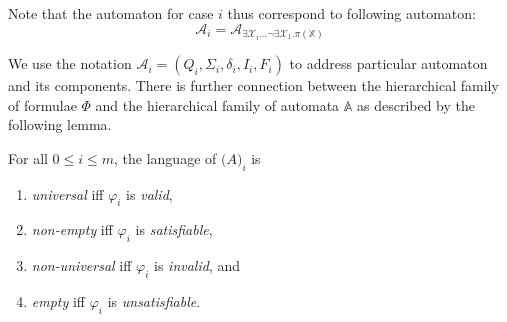  Note that the automaton for case $i$ thus correspond to following automaton:
 \begin{equation} \mathcal{A}_i =
 \mathcal{A}_{\exists\mathcal{X}_i\ldots\neg\exists\mathcal{X}_1.
 \pi(\mathbb{X})}\end{equation}
 
 We use the notation $\mathcal{A}_i = (Q_i, \Sigma_i, \delta_i, I_i, F_i)$ to
 address particular automaton and its components.
There is further connection between the hierarchical family of formulae $\Phi$
and the hierarchical family of automata $\mathbb{A}$ as described by the
following lemma.
 \begin{lemma} For all $0 \leq i \leq m$, the language of
$\mathcal(A)_i$ is
\begin{enumerate}
  \item \emph{universal} iff $\varphi_i$ is \emph{valid},
  \item \emph{non-empty} iff $\varphi_i$ is \emph{satisfiable},
  \item \emph{non-universal} iff $\varphi_i$ is \emph{invalid}, and
  \item \emph{empty} iff $\varphi_i$ is \emph{unsatisfiable}.
\end{enumerate}
\end{lemma}

